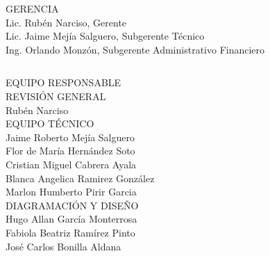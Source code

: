 {\begin{center}
		
		
		
		
		{\Bold \large \color{color1!89!black} GERENCIA}\\[0.2cm]
		Lic. Rubén Narciso, Gerente\\
		Lic. Jaime Mejía Salguero, Subgerente Técnico\\
		Ing. Orlando Monzón, Subgerente Administrativo Financiero\\
		
		
	\end{center}
}{}
\clearpage

$\ $
\vspace{0.5cm}

\begin{center}
	{\Bold \LARGE EQUIPO RESPONSABLE}\\[1.5cm]
	
	{\Bold \large \color{color1!89!black} REVISIÓN GENERAL}\\[0.2cm]
	Rubén Narciso\\[0.8cm]
	
	
	{\Bold \large \color{color1!89!black} EQUIPO TÉCNICO}\\[0.2cm]
	Jaime Roberto Mejía Salguero\\
	Flor de María Hernández Soto\\
	Cristian Miguel Cabrera Ayala\\
	Blanca Angelica Ramirez González\\
	Marlon Humberto Pirir Garcia\\[0.8cm]
	
	{\Bold \large \color{color1!89!black} DIAGRAMACIÓN Y DISEÑO}\\[0.2cm]
	Hugo Allan García Monterrosa\\
	Fabiola Beatriz Ramírez Pinto\\
	José Carlos Bonilla Aldana\\[0.8cm]
	
	
	
\end{center}\setcounter{page}{0}\cleardoublepage



$\ $\\[0.7cm]

\tableofcontents

\cleardoublepage
\pagestyle{estandar}
\setcounter{page}{1}
\setlength{\arrayrulewidth}{1.0pt}


\cleardoublepage





